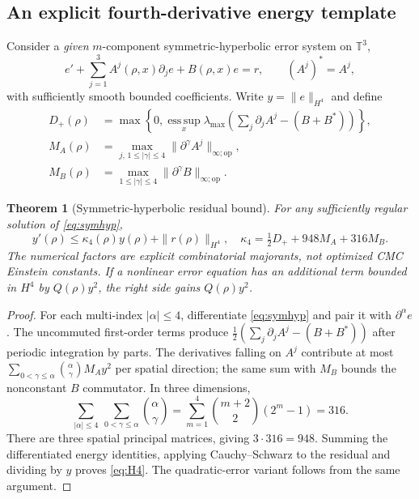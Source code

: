 \documentclass[11pt,a4paper]{article}
\newtheorem{theorem}{Theorem}[section]
\theoremstyle{remark}
\newcommand{\op}{\mathrm{op}}
\begin{document}
\subsection{An explicit fourth-derivative energy template}
Consider a \emph{given} $m$-component symmetric-hyperbolic error system on $\mathbb T^3$,
\begin{equation}\label{eq:symhyp}
e'+\sum_{j=1}^3A^j(\rho,x)\partial_je+B(\rho,x)e=r,
\qquad (A^j)^*=A^j,
\end{equation}
with sufficiently smooth bounded coefficients. Write $y=\|e\|_{H^4}$ and define
\[
\begin{split}
D_+(\rho)&=\max\left\{0,\operatorname*{ess\,sup}_x\lambda_{\max}\left(\sum_j\partial_jA^j-(B+B^*)\right)\right\},\\
M_A(\rho)&=\max_{j,\,1\le|\gamma|\le4}\|\partial^\gamma A^j\|_{\infty;\op},\\
M_B(\rho)&=\max_{1\le|\gamma|\le4}\|\partial^\gamma B\|_{\infty;\op}.
\end{split}
\]
\begin{theorem}[Symmetric-hyperbolic residual bound]\label{thm:FT09}
For any sufficiently regular solution of \eqref{eq:symhyp},
\begin{equation}\label{eq:H4}
y'(\rho)\le\kappa_4(\rho)y(\rho)+\|r(\rho)\|_{H^4},
\quad\kappa_4=\tfrac12D_++948M_A+316M_B.
\end{equation}
The numerical factors are explicit combinatorial majorants, not optimized CMC Einstein constants. If a nonlinear error equation has an additional term bounded in $H^4$ by $Q(\rho)y^2$, the right side gains $Q(\rho)y^2$.
\end{theorem}
\begin{proof}
For each multi-index $|\alpha|\le4$, differentiate \eqref{eq:symhyp} and pair it with $\partial^\alpha e$. The uncommuted first-order terms produce $\frac12(\sum_j\partial_jA^j-(B+B^*))$ after periodic integration by parts. The derivatives falling on $A^j$ contribute at most
$\sum_{0<\gamma\le\alpha}\binom{\alpha}{\gamma}M_Ay^2$ per spatial direction; the same sum with $M_B$ bounds the nonconstant $B$ commutator. In three dimensions,
\[
\sum_{|\alpha|\le4}\ \sum_{0<\gamma\le\alpha}\binom{\alpha}{\gamma}
=\sum_{m=1}^4\binom{m+2}{2}(2^m-1)=316.
\]
There are three spatial principal matrices, giving $3\cdot316=948$. Summing the differentiated energy identities, applying Cauchy--Schwarz to the residual and dividing by $y$ proves \eqref{eq:H4}. The quadratic-error variant follows from the same argument.
\end{proof}
\end{document}
